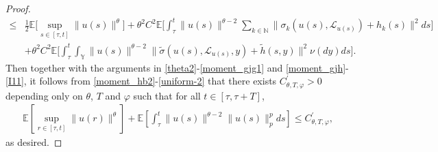 \documentclass[11pt]{article}
\numberwithin{equation}{section}
\theoremstyle{plain}
\begin{document}
\begin{proof}
\begin{align}
   \le & \frac{1}{2} 
            \mathbb{E}
         	     \bigg[ \sup_{s \in [\tau, t] } \|u(s)\|^{\theta}
         	     \bigg]
           + \theta^2 C^2
           	    \mathbb{E}
 	                 \bigg[ \int_{\tau}^{t}
                                     \|u(s)\|^{\theta-2}
 	                                 \sum_{k \in \mathbb{N} }
 	                                       \bigl\| \sigma_k(u(s),\mathcal{L}_{u(s)}) + h_k(s)
 	                                       \bigr\|^{2}
 	                             ds
 	                 \bigg]  \nonumber \\
	   & + \theta^2 C^2
            	\mathbb{E}
            	      \bigg[ \int_{\tau}^{t} 
                       	                \int_{\mathbb{Y} } 
                                       	   \|u(s)\|^{\theta-2}
                    	                   \bigl\| \widetilde{\sigma}(u(s),\mathcal{L}_{u(s)}, y) 
	                                                 + \widetilde{h}(s,y)
	                                       \bigr\|^{2}
	                                 \nu(dy) ds
	                    \bigg]. 		                    		                             
\end{align}
Then together with the arguments in \eqref{theta2}-\eqref{moment_gjg1} and \eqref{moment_gjh}-\eqref{I11}, 
it follows from \eqref{moment_hb2}-\eqref{uniform-2} that there exists $C_{\theta, T, \varphi}^\prime> 0$ depending only on $\theta$, $T$ and $\varphi$ such that for all $t \in [\tau, \tau+T]$,
\begin{align*}
	  \mathbb{E} 
	        \left[ \sup_{r \in [\tau, t]} 
	                          \| u(r) \|^{\theta} 
	        \right]
	  + \mathbb{E} 
	  	        \left[ \int_{\tau}^{t}
	  	                                      \|u(s)\|^{\theta-2} \|u(s)\|_p^p ds 
	  	        \right]   
     \le C_{\theta, T, \varphi}^\prime,
\end{align*}
as desired. 
 \end{proof}
\end{document}
